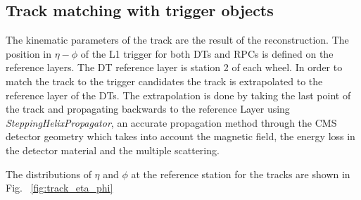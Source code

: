 \subsection{Track matching with trigger objects}
The kinematic parameters of the track are the result of the reconstruction.
The position in $\eta - \phi$ of the L1 trigger for both DTs and RPCs is defined
on the reference layers. The DT reference layer is station 2 of each wheel.
In order to match the track to the trigger candidates the track
is extrapolated to the reference layer of the DTs.
The extrapolation is done by taking the last point of the track and propagating 
backwards to the reference Layer using {\em SteppingHelixPropagator},
an accurate propagation method through the CMS detector
geometry which takes into account the magnetic field, the 
energy loss in the detector material and the multiple scattering.

The distributions of $\eta$ and $\phi$ at the reference 
station for the tracks are shown in Fig. ~\ref{fig:track_eta_phi} 




